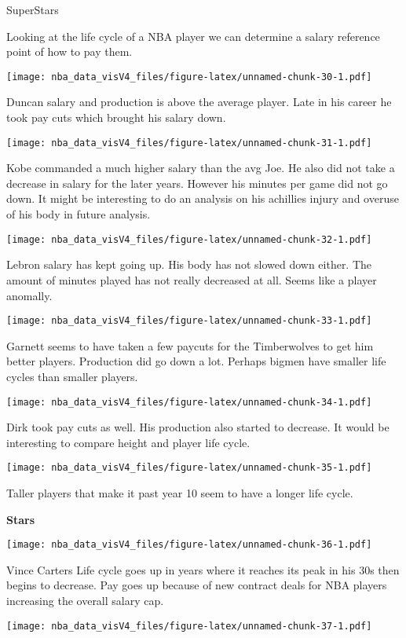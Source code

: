 \documentclass[]{article}
\begin{document}
SuperStars

Looking at the life cycle of a NBA player we can determine a salary
reference point of how to pay them.

\texttt{[image: nba\_data\_visV4\_files/figure-latex/unnamed-chunk-30-1.pdf]}

Duncan salary and production is above the average player. Late in his
career he took pay cuts which brought his salary down.

\texttt{[image: nba\_data\_visV4\_files/figure-latex/unnamed-chunk-31-1.pdf]}

Kobe commanded a much higher salary than the avg Joe. He also did not
take a decrease in salary for the later years. However his minutes per
game did not go down. It might be interesting to do an analysis on his
achillies injury and overuse of his body in future analysis.

\texttt{[image: nba\_data\_visV4\_files/figure-latex/unnamed-chunk-32-1.pdf]}

Lebron salary has kept going up. His body has not slowed down either.
The amount of minutes played has not really decreased at all. Seems like
a player anomally.

\texttt{[image: nba\_data\_visV4\_files/figure-latex/unnamed-chunk-33-1.pdf]}

Garnett seems to have taken a few paycuts for the Timberwolves to get
him better players. Production did go down a lot. Perhaps bigmen have
smaller life cycles than smaller players.

\texttt{[image: nba\_data\_visV4\_files/figure-latex/unnamed-chunk-34-1.pdf]}

Dirk took pay cuts as well. His production also started to decrease. It
would be interesting to compare height and player life cycle.

\texttt{[image: nba\_data\_visV4\_files/figure-latex/unnamed-chunk-35-1.pdf]}

Taller players that make it past year 10 seem to have a longer life
cycle.

\textbf{Stars}

\texttt{[image: nba\_data\_visV4\_files/figure-latex/unnamed-chunk-36-1.pdf]}

Vince Carters Life cycle goes up in years where it reaches its peak in
his 30s then begins to decrease. Pay goes up because of new contract
deals for NBA players increasing the overall salary cap.

\texttt{[image: nba\_data\_visV4\_files/figure-latex/unnamed-chunk-37-1.pdf]}
\end{document}
